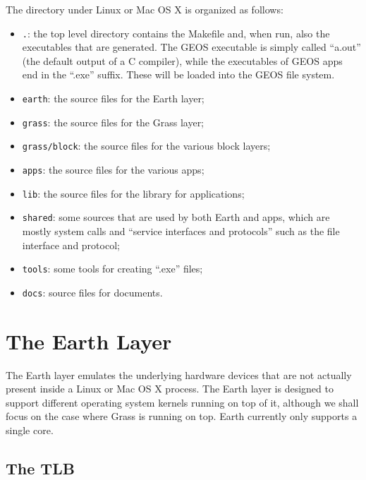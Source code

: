 \documentclass{article}
\begin{document}
The directory under Linux or Mac OS X is organized as follows:
\begin{itemize}
\item \texttt{.}: the top level directory contains the Makefile and,
when run, also the executables that are generated.  The GEOS executable
is simply called ``a.out'' (the default output of a C compiler), while
the executables of GEOS apps end in the ``.exe'' suffix.  These will
be loaded into the GEOS file system.
\item \texttt{earth}: the source files for the Earth layer;
\item \texttt{grass}: the source files for the Grass layer;
\item \texttt{grass/block}: the source files for the various block layers;
\item \texttt{apps}: the source files for the various apps;
\item \texttt{lib}: the source files for the library for applications;
\item \texttt{shared}: some sources that are used by both Earth and apps,
which are mostly system calls and ``service interfaces and protocols'' such
as the file interface and protocol;
\item \texttt{tools}: some tools for creating ``.exe'' files;
\item \texttt{docs}: source files for documents.
\end{itemize}

\section{The Earth Layer}

The Earth layer emulates the underlying hardware devices that are not
actually present inside a Linux or Mac OS X process.  The Earth layer
is designed to support different operating system kernels running on
top of it, although we shall focus on the case where Grass is running
on top.  Earth currently only supports a single core.

\subsection{The TLB}
\end{document}
